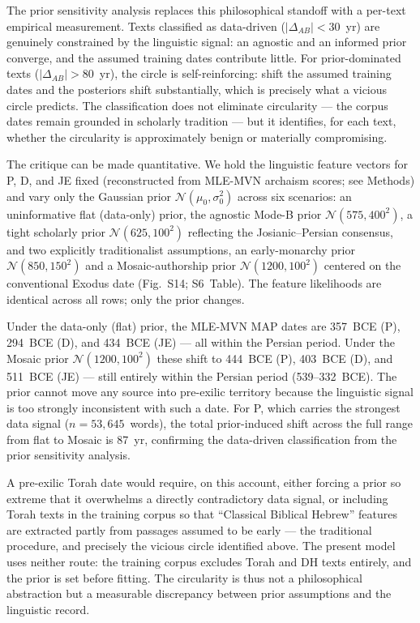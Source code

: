 \documentclass[10pt,letterpaper]{article}
\begin{document}
The prior sensitivity analysis replaces this philosophical standoff with
a per-text empirical measurement.  Texts classified as data-driven
($|\Delta_{AB}| < 30$~yr) are genuinely constrained by the linguistic
signal: an agnostic and an informed prior converge, and the assumed
training dates contribute little.  For prior-dominated texts
($|\Delta_{AB}| > 80$~yr), the circle is self-reinforcing: shift the
assumed training dates and the posteriors shift substantially, which is
precisely what a vicious circle predicts.  The classification does not
eliminate circularity --- the corpus dates remain grounded in scholarly
tradition --- but it identifies, for each text, whether the circularity
is approximately benign or materially compromising.

The critique can be made quantitative.  We hold the linguistic feature
vectors for P, D, and JE fixed (reconstructed from MLE-MVN archaism
scores; see Methods) and vary only the Gaussian prior
$\mathcal{N}(\mu_0,\sigma_0^2)$ across six scenarios: an uninformative
flat (data-only) prior, the agnostic Mode-B prior
$\mathcal{N}(575,400^2)$, a tight scholarly prior
$\mathcal{N}(625,100^2)$ reflecting the Josianic--Persian consensus,
and two explicitly traditionalist assumptions, an early-monarchy prior
$\mathcal{N}(850,150^2)$ and a Mosaic-authorship prior
$\mathcal{N}(1200,100^2)$ centered on the conventional Exodus date
(Fig.~S14; S6~Table).  The feature likelihoods are identical across
all rows; only the prior changes.

Under the data-only (flat) prior, the MLE-MVN MAP dates are 357~BCE
(P), 294~BCE (D), and 434~BCE (JE) --- all within the Persian period.
Under the Mosaic prior $\mathcal{N}(1200,100^2)$ these shift to
444~BCE (P), 403~BCE (D), and 511~BCE (JE) --- still entirely within
the Persian period (539--332~BCE).  The prior cannot move any source
into pre-exilic territory because the linguistic signal is too
strongly inconsistent with such a date.  For P, which carries the
strongest data signal ($n = 53{,}645$~words), the total prior-induced
shift across the full range from flat to Mosaic is 87~yr, confirming
the data-driven classification from the prior sensitivity analysis.

A pre-exilic Torah date would require, on this account, either forcing
a prior so extreme that it overwhelms a directly contradictory data
signal, or including Torah texts in the training corpus so that
``Classical Biblical Hebrew'' features are extracted partly from
passages assumed to be early --- the traditional procedure, and
precisely the vicious circle identified above.  The present model uses
neither route: the training corpus excludes Torah and DH texts
entirely, and the prior is set before fitting.  The circularity is
thus not a philosophical abstraction but a measurable discrepancy
between prior assumptions and the linguistic record.
\end{document}
